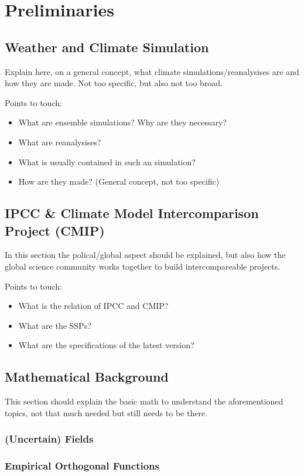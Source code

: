 \chapter{Preliminaries}
\label{ch:preliminaries}

\section{Weather and Climate Simulation}

Explain here, on a general concept, what climate simulations/reanalysises are and how they are made. 
Not too specific, but also not too broad.

Points to touch:
\begin{itemize}
  \item What are ensemble simulations? Why are they necessary?
  \item What are reanalysises?
  \item What is usually contained in such an simulation? 
  \item How are they made? (General concept, not too specific)
  
\end{itemize}



\section{IPCC \& Climate Model Intercomparison Project (CMIP)}

In this section the polical/global aspect should be explained, but also how the global science community works together to build intercompareable projects. \cite{oneill_scenario_2016, riahi_shared_2017}




Points to touch:
\begin{itemize}
  \item What is the relation of IPCC and CMIP?
  \item What are the SSPs?
  \item What are the specifications of the latest version? 
\end{itemize}

\section{Mathematical Background}

This section should explain the basic math to understand the aforementioned topics, not that much needed but still needs to be there.

\subsection{(Uncertain) Fields}

\subsection{Empirical Orthogonal Functions}


